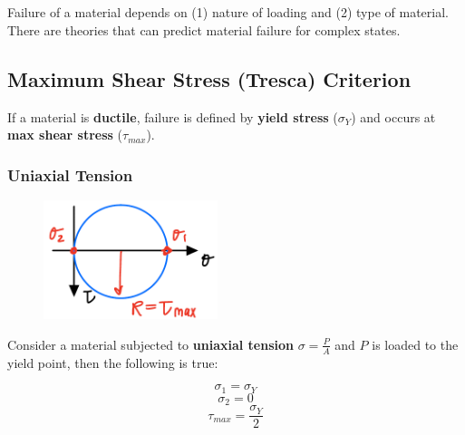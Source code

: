 \section{}


Failure of a material depends on (1) nature of loading and (2) type of material. There are theories that can predict material failure for complex states. 


\subsection{}

\subsection{Maximum Shear Stress (Tresca) Criterion}

\noindent If a material is \textbf{ductile}, failure is defined by \textbf{yield stress} ($\sigma_Y$) and occurs at \textbf{max shear stress} ($\tau_{max}$).

\subsubsection{Uniaxial Tension}

\begin{figure}[!h]
\centering
\includegraphics[angle=0, width=2in]{Failure Theories-Figures/Tresca.png}
\vspace{-2mm}
\caption{\small {}}
\vspace{-3mm}
\label{Fig:Tresca}
\end{figure}

\noindent Consider a material subjected to \textbf{uniaxial tension} $\sigma = \frac{P}{A}$ and $P$ is loaded to the yield point, then the following is true:

\[\sigma_1 = \sigma_Y\]
\[\sigma_2 = 0\]
\[\tau_{max} = \frac{\sigma_Y}{2}\]

